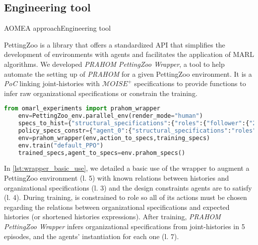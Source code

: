 \subsection{Engineering tool}

\begin{frame}[fragile]{AOMEA approach}{Engineering tool}


    PettingZoo is a library that offers a standardized API that simplifies the development of environments with agents and facilitates the application of MARL algorithms.
    We developed \emph{PRAHOM PettingZoo Wrapper}\label{PettingZoo-wrapper}, a tool to help automate the setting up of \emph{PRAHOM} for a given PettingZoo environment.
    It is a \emph{PoC} linking joint-histories with $\mathcal{M}OISE^+$ specifications to provide functions to infer raw organizational specifications or constrain the training.

    \begin{lstlisting}[language=Python, caption=PRAHOM PettingZoo Wrapper basic use, label={lst:wrapper_basic_use}]
    from omarl_experiments import prahom_wrapper
    env=PettingZoo_env.parallel_env(render_mode="human")
    specs_to_hist={"structural_specifications":{"roles":{"follower":{"23":41,"14":[74,0]}}...},"functional_specifications":{"links":{"(leader,follower,aut)":".*14.*?89"}...}...}
    policy_specs_constr={"agent_0":{"structural_specifications":"roles":["follower"]}}
    env=prahom_wrapper(env,action_to_specs,training_specs)
    env.train("default_PPO")
    trained_specs,agent_to_specs=env.prahom_specs()
    \end{lstlisting}

    In \autoref{lst:wrapper_basic_use}, we detailed a basic use of the wrapper to augment a PettingZoo environment (l. 5) with known relations between histories and organizational specifications (l. 3) and the design constraints agents are to satisfy (l. 4).
    During training,  is constrained to role  so all of its actions must be chosen regarding the relations between organizational specifications and expected histories (or shortened histories expressions).
    After training, \emph{PRAHOM PettingZoo Wrapper} infers organizational specifications from joint-histories in 5 episodes, and the agents' instantiation for each one (l. 7).


\end{frame}
